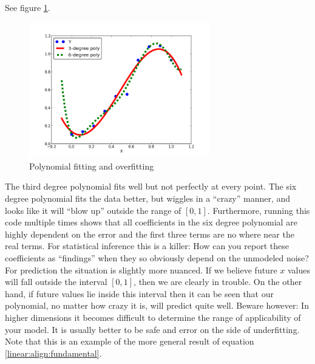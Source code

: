 \begin{example}
See figure \ref{linear:figure:polyfit}.
\begin{figure}
  \label{linear:figure:polyfit}
  \includegraphics[width=0.7\textwidth]{../images/polynomial}
  \caption{Polynomial fitting and overfitting}
\end{figure}
The third degree polynomial fits well but not perfectly at every point.  The six degree polynomial fits the data better, but wiggles in a ``crazy'' manner, and looks like it will ``blow up'' outside the range of $[0,1]$.  Furthermore, running this code multiple times shows that all coefficients in the six degree polynomial are highly dependent on the error and the first three terms are no where near the real terms.  For statistical inference this is a killer:  How can you report these coefficients as ``findings'' when they so obviously depend on the unmodeled noise?  For prediction the situation is slightly more nuanced.  If we believe future $x$ values will fall outside the interval $[0,1]$, then we are clearly in trouble.  On the other hand, if future values lie inside this interval then it can be seen that our polynomial, no matter how crazy it is, will predict quite well.  Beware however:  In higher dimensions it becomes difficult to determine the range of applicability of your model.  It is usually better to be safe and error on the side of underfitting.  Note that this is an example of the more general result of equation \eqref{linear:align:fundamental}.
\end{example}


